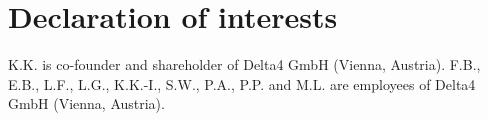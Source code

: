 \section*{Declaration of interests}

K.K. is co-founder and shareholder of Delta4 GmbH (Vienna, Austria). 
F.B., E.B., L.F., L.G., K.K.-I., S.W., P.A., P.P. and M.L. are employees of Delta4 GmbH (Vienna, Austria).